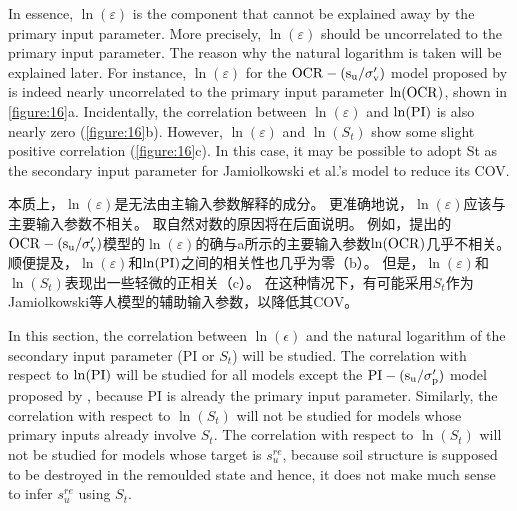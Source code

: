 \begin{paracol}{2}

    In essence, $\ln(\varepsilon)$ is the component that cannot be explained away by the primary input parameter. More precisely, $\ln(\varepsilon)$ should be uncorrelated to the primary input parameter. The reason why the natural logarithm is taken will be explained later. For instance, $\ln(\varepsilon)$ for the $\rm{OCR}-(s_u/\sigma_v')$ model proposed by \citet{Jamiolkowski198557} is indeed nearly uncorrelated to the primary input parameter $\ln(\rm{OCR})$, shown in \autoref{figure:16}a. Incidentally, the correlation between $\ln(\varepsilon)$ and $\ln(\rm{PI})$ is also nearly zero (\autoref{figure:16}b). However, $\ln(\varepsilon)$ and $\ln(S_t)$ show some slight positive correlation (\autoref{figure:16}c). In this case, it may be possible to adopt St as the secondary input parameter for Jamiolkowski et al.’s model to reduce its COV.

    \switchcolumn

    本质上，$\ln(\varepsilon)$是无法由主输入参数解释的成分。 更准确地说，$\ln(\varepsilon)$应该与主要输入参数不相关。 取自然对数的原因将在后面说明。 例如，\citet{Jamiolkowski198557}提出的$\rm{OCR}-(s_u/\sigma_v')$模型的$\ln(\varepsilon)$的确与a所示的主要输入参数$\ln(\rm{OCR})$几乎不相关。 顺便提及，$\ln(\varepsilon)$和$\ln(\rm{PI})$之间的相关性也几乎为零（b）。 但是，$\ln(\varepsilon)$和$\ln(S_t)$表现出一些轻微的正相关（c）。 在这种情况下，有可能采用$S_t$作为Jamiolkowski等人模型的辅助输入参数，以降低其COV。

    
    \switchcolumn*

    In this section, the correlation between $\ln(\epsilon)$ and the natural logarithm of the secondary input parameter (PI or $S_t$) will be  studied. The correlation with respect to $\ln(\rm{PI})$ will be studied for all models except the $\rm{PI}-(s_u/\sigma_p')$ model proposed by \citet{Mesri1975409, Mesri1989162}, because PI is already the primary input parameter. Similarly, the correlation with respect to $\ln(S_t)$ will not be studied for models whose primary inputs already involve $S_t$. The correlation with respect to $\ln(S_t)$ will not be studied for models whose target is $s_u^{re}$, because soil structure is supposed to be destroyed in the  remoulded state and hence, it does not make much sense to infer $s_u^{re}$ using $S_t$.

    \switchcolumn


\end{paracol}
